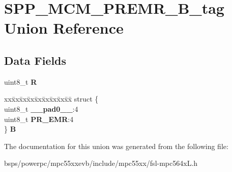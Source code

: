\hypertarget{unionSPP__MCM__PREMR__8B__tag}{}\section{S\+P\+P\+\_\+\+M\+C\+M\+\_\+\+P\+R\+E\+M\+R\+\_\+B\+\_\+tag Union Reference}
\label{unionSPP__MCM__PREMR__8B__tag}
\subsection*{Data Fields}
\begin{DoxyCompactItemize}
\item 
\mbox{\label{unionSPP__MCM__PREMR__8B__tag_a74ac91fbac49aa25b799a9d527a7857b}} 
uint8\+\_\+t {\bfseries R}
\item 
\mbox{\label{unionSPP__MCM__PREMR__8B__tag_abb51b3d7fe6e3ffb87e651fa3245ab07}} 
\begin{tabbing}
xx\=xx\=xx\=xx\=xx\=xx\=xx\=xx\=xx\=\kill
struct \{\\
\>uint8\_t {\bfseries \_\_pad0\_\_}:4\\
\>uint8\_t {\bfseries PR\_EMR}:4\\
\} {\bfseries B}\\

\end{tabbing}\end{DoxyCompactItemize}


The documentation for this union was generated from the following file\+:\begin{DoxyCompactItemize}
\item 
bsps/powerpc/mpc55xxevb/include/mpc55xx/fsl-\/mpc564x\+L.\+h\end{DoxyCompactItemize}
